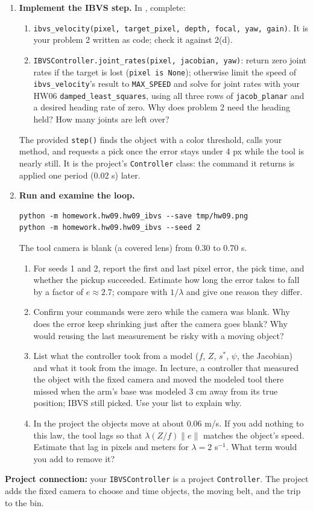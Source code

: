 \newpage
\begin{enumerate}[start=3]
\item \textbf{Implement the IBVS step.}
In , complete:
\begin{enumerate}
\item \texttt{ibvs\_velocity(pixel, target\_pixel, depth, focal, yaw, gain)}.
It is your problem 2 written as code; check it against 2(d).
\item \texttt{IBVSController.joint\_rates(pixel, jacobian, yaw)}: return
zero joint rates if the target is lost (\texttt{pixel is None}); otherwise
limit the speed of \texttt{ibvs\_velocity}'s result to \texttt{MAX\_SPEED} and
solve for joint rates with your HW06 \texttt{damped\_least\_squares}, using
all three rows of \texttt{jacob\_planar} and a desired heading rate of zero.
Why does problem 2 need the heading held? How many joints are left over?
\end{enumerate}
The provided \texttt{step()} finds the object with a color threshold, calls
your method, and requests a pick once the error stays under 4 px while the
tool is nearly still. It is the project's \texttt{Controller} class: the
command it returns is applied one period (0.02 s) later.

\item \textbf{Run and examine the loop.}
\begin{lstlisting}
python -m homework.hw09.hw09_ibvs --save tmp/hw09.png
python -m homework.hw09.hw09_ibvs --seed 2
\end{lstlisting}
The tool camera is blank (a covered lens) from 0.30 to 0.70 s.
\begin{enumerate}
\item For seeds 1 and 2, report the first and last pixel error, the pick
time, and whether the pickup succeeded. Estimate how long the error takes to
fall by a factor of $e\approx2.7$; compare with $1/\lambda$ and give one
reason they differ.
\item Confirm your commands were zero while the camera was blank. Why does
the error keep shrinking just after the camera goes blank? Why would reusing
the last measurement be risky with a moving object?
\item List what the controller took from a model ($f$, $Z$, $s^*$, $\psi$,
the Jacobian) and what it took from the image. In lecture, a controller that
measured the object with the fixed camera and moved the modeled tool there
missed when the arm's base was modeled 3 cm away from its true position;
IBVS still picked. Use your list to explain why.
\item In the project the objects move at about $0.06$ m/s. If you add
nothing to this law, the tool lags so that $\lambda(Z/f)\|e\|$ matches the
object's speed. Estimate that lag in pixels and meters for $\lambda=2$
s$^{-1}$. What term would you add to remove it?
\end{enumerate}
\end{enumerate}

\textbf{Project connection:} your \texttt{IBVSController} is a project
\texttt{Controller}. The project adds the fixed camera to choose and time
objects, the moving belt, and the trip to the bin.

\submission

